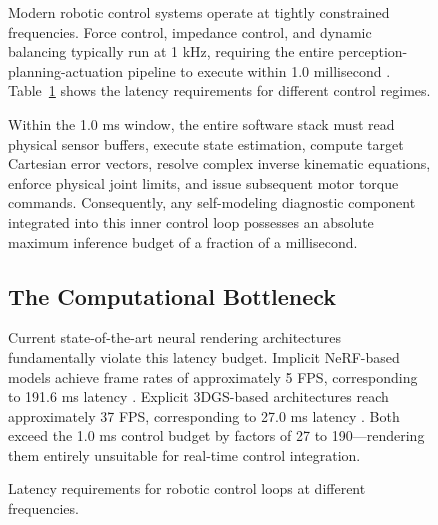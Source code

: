 \documentclass[12pt,a4paper,oneside]{report}
\begin{document}
\begin{figure}[H]
Modern robotic control systems operate at tightly constrained frequencies. Force control, impedance control, and dynamic balancing typically run at 1 kHz, requiring the entire perception-planning-actuation pipeline to execute within 1.0 millisecond \cite{siciliano2009robotics}. Table~\ref{tab:control_loop_latency} shows the latency requirements for different control regimes.

\begin{table}[H]
\centering
\caption{Latency requirements for robotic control loops at different frequencies.}
\label{tab:control_loop_latency}
\end{table}

Within the 1.0 ms window, the entire software stack must read physical sensor buffers, execute state estimation, compute target Cartesian error vectors, resolve complex inverse kinematic equations, enforce physical joint limits, and issue subsequent motor torque commands. Consequently, any self-modeling diagnostic component integrated into this inner control loop possesses an absolute maximum inference budget of a fraction of a millisecond.

\subsection{The Computational Bottleneck}
\label{subsec:computational_bottleneck}

Current state-of-the-art neural rendering architectures fundamentally violate this latency budget. Implicit NeRF-based models achieve frame rates of approximately 5 FPS, corresponding to 191.6 ms latency \cite{hu2024teaching}. Explicit 3DGS-based architectures reach approximately 37 FPS, corresponding to 27.0 ms latency \cite{hu2025learning}. Both exceed the 1.0 ms control budget by factors of 27 to 190---rendering them entirely unsuitable for real-time control integration.


\end{figure}
\end{document}
